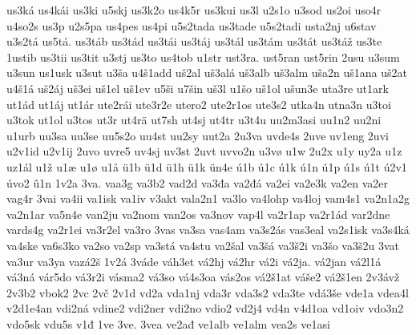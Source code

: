 {    us3ká
    us4kái
    us3ki
    u5skj
    us3k2o
    us4k5r
    us3kui
    us3l
    u2s1o
    u3sod
    us2oi
    uso4r
    u4so2s
    us3p
    u2s5pa
    us4pes
    us4pi
    u5s2tada
    us3tade
    u5s2tadi
    usta2nj
    u6stav
    u3s2tá
    us5tá.
    us3táb
    us3tád
    us3tái
    us3táj
    us3tál
    us3tám
    us3tát
    us3táž
    us3te
    1ustib
    us3tii
    us3tit
    u3stj
    us3to
    us4tob
    u1str
    ust3ra.
    ust5ran
    ust5rin
    2usu
    u3sum
    u3sun
    us1usk
    u3sut
    u3ša
    u4š1add
    uš2al
    uš3alá
    uš3alb
    uš3alm
    uša2n
    uš1ana
    uš2at
    u4š1á
    uš2áj
    uš3ei
    uš1el
    uš1ev
    u5ši
    u7šin
    uš3l
    u1šo
    uš1ol
    ušun3e
    uta3re
    ut1ark
    ut1ád
    ut1áj
    ut1ár
    ute2rái
    ute3r2e
    utero2
    ute2r1os
    ute3s2
    utka4n
    utna3n
    u3toi
    u3tok
    ut1ol
    u3tos
    ut3r
    ut4rä
    ut7sh
    ut4sj
    ut4tr
    u3t4u
    uu2m3asi
    uu1n2
    uu2ni
    u1urb
    uu3sa
    uu3se
    uu5s2o
    uu4st
    uu2sy
    uut2a
    2u3va
    uvde4s
    2uve
    uv1eng
    2uvi
    u2v1id
    u2v1ij
    2uvo
    uvre5
    uv4sj
    uv3st
    2uvt
    uvvo2n
    u3vø
    u1w
    2u2x
    u1y
    uy2a
    u1z
    uz1ál
    u1ž
    u1æ
    u1ø
    u1å
    ü1b
    ü1d
    ü1h
    ü1k
    ün4e
    ú1b
    ú1c
    ú1k
    ú1n
    ú1p
    ú1s
    ú1t
    ú2v1
    úvo2
    û1n
    1v2a
    3va.
    vaa3g
    va3b2
    vad2d
    va3đa
    va2đá
    va2ei
    va2e3k
    va2en
    va2er
    vag4r
    3vai
    va4ii
    va1isk
    va1iv
    v3akt
    vala2n1
    va3lo
    va4lohp
    va4loj
    vam4s1
    va2n1a2g
    va2n1ar
    va5n4e
    van2ju
    va2nom
    van2os
    va3nov
    vap4l
    va2r1ap
    va2r1ád
    var2dne
    vards4g
    va2r1ei
    va3r2el
    va3ro
    3vas
    va3sa
    vas4am
    va3s2ás
    vas3eal
    va2s1isk
    va3s4ká
    va4ske
    va6s3ko
    va2so
    va2sp
    va3stá
    va4stu
    va2šal
    va3šá
    va3š2i
    va3šo
    va3š2u
    3vat
    va3ur
    va3ya
    vazá2š
    1v2á
    3váde
    váh3et
    vá2hj
    vá2hr
    vá2i
    vá2ja.
    vá2jan
    vá2l1á
    vá3ná
    vár5do
    vá3r2i
    vásma2
    vá3so
    vá4s3oa
    vás2os
    vá2š1at
    váše2
    vá2š1en
    2v3ávž
    2v3b2
    vbok2
    2vc
    2vč
    2v1d
    vd2a
    vda1nj
    vda3r
    vda3s2
    vda3te
    vdá3še
    vde1a
    vdea4l
    v2d1e4an
    vdi2ná
    vdine2
    vdi2ner
    vdi2no
    vdio2
    vd2j4
    vd4n
    v4d1oa
    vd1oiv
    vdo3n2
    vdo5sk
    vdu5s
    v1đ
    1ve
    3ve.
    3vea
    ve2ađ
    ve1alb
    ve1alm
    vea2s
    ve1asi
}
